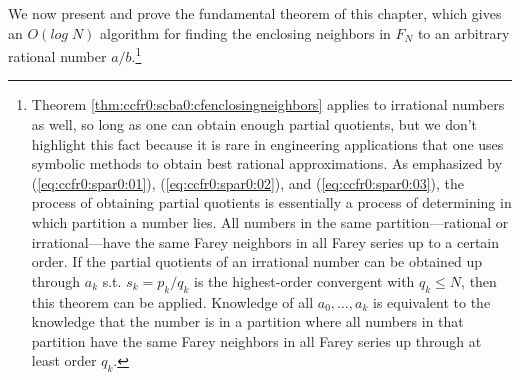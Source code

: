 We now present and prove the fundamental theorem of this chapter, which gives an
$O(log \; N)$ algorithm for finding the enclosing neighbors in $F_N$ to an arbitrary 
rational number $a/b$.\footnote{\label{footnote:ccfr0:scba0:rationalitynotrequired}Theorem 
\ref{thm:ccfr0:scba0:cfenclosingneighbors}
applies to irrational numbers as well,
so long as one can obtain enough partial quotients, but we don't highlight this
fact because it is rare in engineering applications that one uses symbolic methods
to obtain best rational approximations.
As emphasized by (\ref{eq:ccfr0:spar0:01}), (\ref{eq:ccfr0:spar0:02}), and 
(\ref{eq:ccfr0:spar0:03}),
the process of obtaining partial quotients is essentially a process of determining in which
partition a number lies.  All numbers in the same partition---rational or
irrational---have the same Farey neighbors in all Farey series up to a certain order.
If the partial quotients of
an irrational number can be obtained up through $a_k$ s.t. $s_k = p_k/q_k$ is the
highest-order convergent with $q_k \leq N$, then this theorem can be applied.
Knowledge of all $a_0, \ldots{} , a_k$ is equivalent
to the knowledge that the number is in a partition where all numbers in that partition have
the same Farey neighbors in all Farey series up through at least order $q_k$.}


